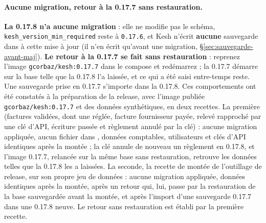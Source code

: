 \documentclass[a4paper,11pt,oneside]{article}
\begin{document}
\paragraph{Aucune migration, retour à la 0.17.7 sans restauration.} \textbf{La 0.17.8 n'a aucune migration} : elle ne modifie pas le schéma, \texttt{kesh\_version\_min\_required} reste à \texttt{0.17.6}, et Kesh n'écrit \textbf{aucune} sauvegarde dans  à cette mise à jour (il n'en écrit qu'avant une migration, \S\ref{sec:sauvegarde-avant-maj}). \textbf{Le retour à la 0.17.7 se fait sans restauration} : reprenez l'image \texttt{gcorbaz/kesh:0.17.7} dans le compose et redémarrez ; la 0.17.7 démarre sur la base telle que la 0.17.8 l'a laissée, et ce qui a été saisi entre-temps reste. Une sauvegarde  prise en 0.17.7 s'importe dans la 0.17.8. Ces comportements ont été constatés à la préparation de la release, avec l'image publiée \texttt{gcorbaz/kesh:0.17.7} et des données synthétiques, en deux recettes. La première (factures validées, dont une réglée, facture fournisseur payée, relevé rapproché par une clé d'API, écriture passée et règlement annulé par la clé) : aucune migration appliquée, aucun fichier dans , données comptables, utilisateurs et clés d'API identiques après la montée ; la clé annule de nouveau un règlement en 0.17.8, et l'image 0.17.7, relancée sur la même base sans restauration, retrouve les données telles que la 0.17.8 les a laissées. La seconde, la recette de montée de l'outillage de release, sur son propre jeu de données : aucune migration appliquée, données identiques après la montée, après un retour qui, lui, passe par la restauration de la base sauvegardée avant la montée, et après l'import d'une sauvegarde 0.17.7 dans une 0.17.8 neuve. Le retour sans restauration est établi par la première recette.
\end{document}
